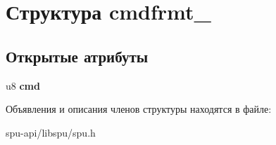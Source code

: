 \hypertarget{structcmdfrmt__0}{}\section{Структура cmdfrmt\+\_}
\label{structcmdfrmt__0}
\subsection*{Открытые атрибуты}
\begin{DoxyCompactItemize}
\item 
\mbox{\label{structcmdfrmt__0_a86c8257196b38bf4a7b6118d29ca8c8a}} 
u8 {\bfseries cmd}
\end{DoxyCompactItemize}


Объявления и описания членов структуры находятся в файле\+:\begin{DoxyCompactItemize}
\item 
spu-\/api/libspu/spu.\+h\end{DoxyCompactItemize}
